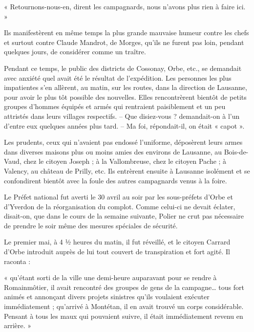 \documentclass[french,twoside]{book} %
\newenvironment{quoteblock}%
  {\begin{quoting}}
  {\end{quoting}}
\newenvironment{quotebar}{%
    \def\FrameCommand{{\color{rubric!10!}\vrule width 0.5em} \hspace{0.9em}}%
    \def\OuterFrameSep{\itemsep} %
    \MakeFramed {\advance\hsize-\width \FrameRestore}
  }%
  {%
    \endMakeFramed
  }
\renewenvironment{quoteblock}%
  {%
    \savenotes
    \setstretch{0.9}
    \begin{quotebar}
  }
  {%
    \end{quotebar}
    \spewnotes
  }
\begin{document}
\begin{quoteblock}
\noindent « Retournons-nous-en, dirent les campagnards, nous n’avons plus rien à faire ici. »\end{quoteblock}

\noindent Ils manifestèrent en même temps la plus grande mauvaise humeur contre les chefs et surtout contre Claude Mandrot, de Morges, qu’ils ne furent pas loin, pendant quelques jours, de considérer comme un traître.\par
Pendant ce temps, le public des districts de Cossonay, Orbe, etc., se demandait avec anxiété quel avait été le résultat de l’expédition. Les personnes les plus impatientes s’en allèrent, au matin, sur les routes, dans la direction de Lausanne, pour avoir le plus tôt possible des nouvelles. Elles rencontrèrent bientôt de petits groupes d’hommes équipés et armés qui rentraient paisiblement et un peu attristés dans leurs villages respectifs. – Que disiez-vous ? demandait-on à l’un d’entre eux quelques années plus tard. – Ma foi, répondait-il, on était « capot ».\par
Les prudents, ceux qui n’avaient pas endossé l’uniforme, déposèrent leurs armes dans diverses maisons plus ou moins amies des environs de Lausanne, au Bois-de-Vaud, chez le citoyen Joseph ; à la Vallombreuse, chez le citoyen Pache ; à Valency, au château de Prilly, etc. Ils entrèrent ensuite à Lausanne isolément et se confondirent bientôt avec la foule des autres campagnards venus à la foire.\par
Le Préfet national fut averti le 30 avril au soir par les sous-préfets d’Orbe et d’Yverdon de la réorganisation du complot. Comme celui-ci ne devait éclater, disait-on, que dans le cours de la semaine suivante, Polier ne crut pas nécessaire de prendre le soir même des mesures spéciales de sécurité.\par
Le premier mai, à 4 ½ heures du matin, il fut réveillé, et le citoyen Carrard d’Orbe introduit auprès de lui tout couvert de transpiration et fort agité. Il raconta :\par

\begin{quoteblock}
\noindent « qu’étant sorti de la ville une demi-heure auparavant pour se rendre à Romainmôtier, il avait rencontré des groupes de gens de la campagne… tous fort animés et annonçant divers projets sinistres qu’ils voulaient exécuter immédiatement ; qu’arrivé à Montétan, il en avait trouvé un corps considérable. Pensant à tous les maux qui pouvaient suivre, il était immédiatement revenu en arrière. »\end{quoteblock}
\end{document}

